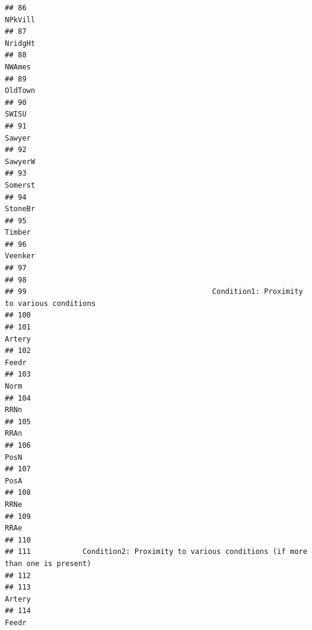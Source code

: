 \documentclass[
]{article}
\begin{document}
\begin{verbatim}
## 86                                                                               NPkVill
## 87                                                                               NridgHt
## 88                                                                                NWAmes
## 89                                                                               OldTown
## 90                                                                                 SWISU
## 91                                                                                Sawyer
## 92                                                                               SawyerW
## 93                                                                               Somerst
## 94                                                                               StoneBr
## 95                                                                                Timber
## 96                                                                               Veenker
## 97                                                                                      
## 98                                                                                      
## 99                                           Condition1: Proximity to various conditions
## 100                                                                                     
## 101                                                                               Artery
## 102                                                                                Feedr
## 103                                                                                 Norm
## 104                                                                                 RRNn
## 105                                                                                 RRAn
## 106                                                                                 PosN
## 107                                                                                 PosA
## 108                                                                                 RRNe
## 109                                                                                 RRAe
## 110                                                                                     
## 111            Condition2: Proximity to various conditions (if more than one is present)
## 112                                                                                     
## 113                                                                               Artery
## 114                                                                                Feedr

\end{verbatim}
\end{document}
